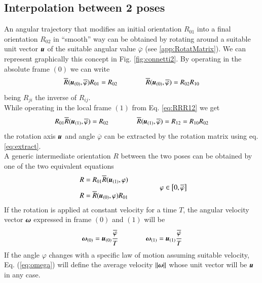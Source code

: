 \subsection{Interpolation between 2 poses}
\label{subsec:connetti2}
An angular trajectory that modifies an initial orientation $R_{01}$ into a final orientation $R_{02}$ in ``smooth'' way can be obtained by rotating around a suitable unit vector ${\boldsymbol{u}}$ of the suitable angular value $\overline{\varphi}$ (see \ref{app:RotatMatrix}). We can represent graphically this concept in Fig. \ref{fig:connetti2}. By operating in the absolute frame $(0)$ we can write
\begin{equation}
\overline{R}({\boldsymbol{u}}_{(0)},\overline{\varphi})R_{01}=R_{02}
\qquad\qquad
    \overline{R}({\boldsymbol{u}}_{(0)},\overline{\varphi}) =R_{02}R_{10}
    \label{eq:rotat_u0}
\end{equation}
being $R_{ji}$ the inverse of $R_{ij}$.\\
While operating in the local frame $(1)$ from Eq. \ref{eq:RRR12} we get
\begin{equation}
R_{01}\overline{R}({\boldsymbol{u}}_{(1)},\overline{\varphi})=R_{02}
\qquad\qquad
    \overline{R}({\boldsymbol{u}}_{(1)},\overline{\varphi})=R_{12} =R_{10}R_{02}
    \label{eq:rotat_u1}
\end{equation}
the rotation axis ${\boldsymbol{u}}$ and angle $\overline{\varphi}$ can be extracted by the rotation matrix using  eq. \ref{eq:extract}.\\ %
A generic intermediate orientation $R$ between the two poses can be obtained by one of the two equivalent equations
\begin{equation}
    \begin{array}{l}
        R = R_{01} \overline{R}({\boldsymbol{u}}_{(1)},\varphi)\\[2ex]
        R = \overline{R}({\boldsymbol{u}}_{(0)},\varphi) R_{01}
    \end{array}
    \qquad\qquad
    \varphi \in \left[ 0, \overline{\varphi} \right]
    \label{eq:rotat_int}
\end{equation}
If the rotation is applied at constant velocity for a time $T$, the angular velocity vector ${\boldsymbol{\omega}}$ expressed in frame $(0)$ and $(1)$ will be
\begin{equation}
    {\boldsymbol{\omega}}_{(0)} = {\boldsymbol{u}}_{(0)} \cfrac{\overline{\varphi}}{T}
    \qquad\qquad
    {\boldsymbol{\omega}}_{(1)} = {\boldsymbol{u}}_{(1)} \cfrac{\overline{\varphi}}{T}
    \label{eq:omega}
\end{equation}
If the angle $\varphi$ changes with a specific law of motion assuming suitable velocity, Eq. (\ref{eq:omega}) will define the average velocity $\left\lVert{\boldsymbol{\omega}}\right\rVert$ whose unit vector will be ${\boldsymbol{u}}$ in any case. 

